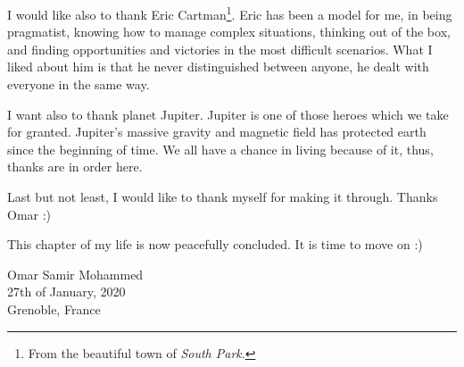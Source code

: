 \par I would like also to thank Eric Cartman\footnote{From the beautiful town of \textit{South Park}.}. Eric has been a model for me, in being pragmatist, knowing how to manage complex situations, thinking out of the box, and finding opportunities and victories in the most difficult scenarios. What I liked about him is that he never distinguished between anyone, he dealt with everyone in the same way.

\par I want also to thank planet Jupiter. Jupiter is one of those heroes which we take for granted. Jupiter's massive gravity and magnetic field has protected earth since the beginning of time. We all have a chance in living because of it, thus, thanks are in order here.

\par Last but not least, I would like to thank myself for making it through. Thanks Omar :)

\par This chapter of my life is now peacefully concluded. It is time to move on :)

\begin {flushright}
  Omar Samir Mohammed\\
  27th of January, 2020\\
  Grenoble, France
\end {flushright}
